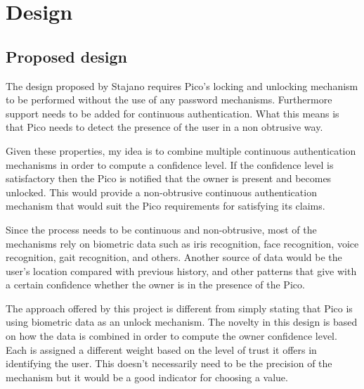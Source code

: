 
\chapter{Design} %

\label{Chapter4} %



\section{Proposed design}
The design proposed by Stajano \cite{stajano2011pico} requires Pico's  locking and unlocking mechanism to be performed without the use of any password mechanisms. Furthermore support needs to be added for continuous authentication. What this means is that Pico needs to detect the presence of the user in a non obtrusive way.

Given these properties, my idea is to combine multiple continuous authentication mechanisms in order to compute a confidence level. If the confidence level is satisfactory then the Pico is notified that the owner is present and becomes unlocked. This would provide a non-obtrusive continuous authentication mechanism that would suit the Pico requirements for satisfying its claims.

Since the process needs to be continuous and non-obtrusive, most of the mechanisms rely on biometric data such as iris recognition, face recognition, voice recognition, gait recognition, and others. Another source of data would be the user's location compared with previous history, and other patterns that give with a certain confidence whether the owner is in the presence of the Pico.

The approach offered by this project is different from simply stating that Pico is using biometric data as an unlock mechanism. The novelty in this design is based on how the data is combined in order to compute the owner confidence level. Each is assigned a different weight based on the level of trust it offers in identifying the user. This doesn't necessarily need to be the precision of the mechanism but it would be a good indicator for choosing a value.

